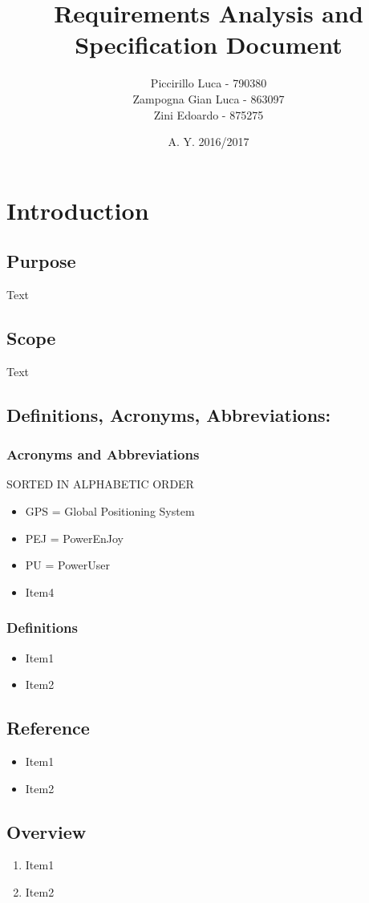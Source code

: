 \documentclass{article}
\title{Requirements Analysis and Specification Document}
\author{Piccirillo Luca - 790380\\
Zampogna Gian Luca - 863097\\
Zini Edoardo - 875275}
\date{A. Y. 2016/2017}
\begin{document}
\maketitle
\newpage
{}
\tableofcontents
\newpage
{}

\iffalse SECTION 1 \fi 
\section{Introduction}
\subsection{Purpose}
Text
\subsection{Scope}
Text
\subsection{Definitions, Acronyms, Abbreviations:}
\subsubsection{Acronyms and Abbreviations}
SORTED IN ALPHABETIC ORDER
\begin{itemize}
\item GPS = Global Positioning System
\item PEJ = PowerEnJoy
\item PU = PowerUser
\item Item4
\end{itemize}
\subsubsection{Definitions}
\begin{itemize}
\item Item1
\item Item2
\end{itemize}
\subsection{Reference}
\begin{itemize}
\item Item1
\item Item2
\end{itemize}
\subsection{Overview}
\begin{enumerate}
\item Item1
\item Item2
\end{enumerate}
\end{document}
